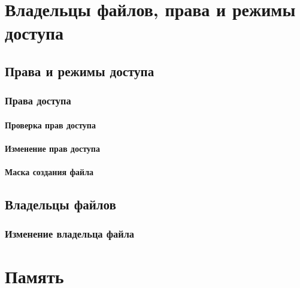 \documentclass[oneside]{book}
\begin{document}
		


\part{Владельцы файлов, права и режимы доступа}
%

	\chapter{Права и режимы доступа}
	
	
		\section{Права доступа}
		
		
			\subsection{Проверка прав доступа}
			
			
			\subsection{Изменение прав доступа}
			
		
			\subsection{Маска создания файла}
			
			
		
	\chapter{Владельцы файлов}
	
	
		\section{Изменение владельца файла}
		
	


\part{Память}
%
\end{document}

